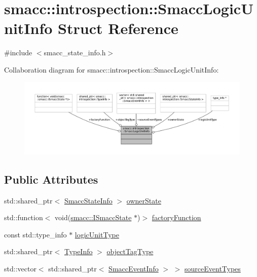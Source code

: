 \hypertarget{structsmacc_1_1introspection_1_1SmaccLogicUnitInfo}{}\section{smacc\+:\+:introspection\+:\+:Smacc\+Logic\+Unit\+Info Struct Reference}
\label{structsmacc_1_1introspection_1_1SmaccLogicUnitInfo}


{\ttfamily \#include $<$smacc\+\_\+state\+\_\+info.\+h$>$}



Collaboration diagram for smacc\+:\+:introspection\+:\+:Smacc\+Logic\+Unit\+Info\+:
\nopagebreak
\begin{figure}[H]
\begin{center}
\leavevmode
\includegraphics[width=350pt]{structsmacc_1_1introspection_1_1SmaccLogicUnitInfo__coll__graph}
\end{center}
\end{figure}
\subsection*{Public Attributes}
\begin{DoxyCompactItemize}
\item 
std\+::shared\+\_\+ptr$<$ \hyperlink{classsmacc_1_1introspection_1_1SmaccStateInfo}{Smacc\+State\+Info} $>$ \hyperlink{structsmacc_1_1introspection_1_1SmaccLogicUnitInfo_a9b6a74ef053eb083efc64febe1bb9db2}{owner\+State}
\item 
std\+::function$<$ void(\hyperlink{classsmacc_1_1ISmaccState}{smacc\+::\+I\+Smacc\+State} $\ast$)$>$ \hyperlink{structsmacc_1_1introspection_1_1SmaccLogicUnitInfo_ad98da99b4913a3dcad4309005cf30072}{factory\+Function}
\item 
const std\+::type\+\_\+info $\ast$ \hyperlink{structsmacc_1_1introspection_1_1SmaccLogicUnitInfo_af399d58635280862b10116c76cb6e0f8}{logic\+Unit\+Type}
\item 
std\+::shared\+\_\+ptr$<$ \hyperlink{classsmacc_1_1introspection_1_1TypeInfo}{Type\+Info} $>$ \hyperlink{structsmacc_1_1introspection_1_1SmaccLogicUnitInfo_a4a1fc60624c6ad423c28a0bece4805ea}{object\+Tag\+Type}
\item 
std\+::vector$<$ std\+::shared\+\_\+ptr$<$ \hyperlink{structsmacc_1_1introspection_1_1SmaccEventInfo}{Smacc\+Event\+Info} $>$ $>$ \hyperlink{structsmacc_1_1introspection_1_1SmaccLogicUnitInfo_add386e83d888a7819c0132a75942fa5d}{source\+Event\+Types}
\end{DoxyCompactItemize}


